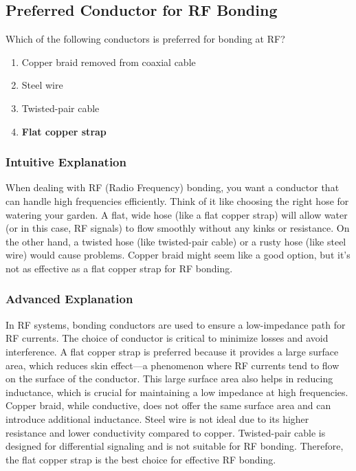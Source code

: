 \subsection{Preferred Conductor for RF Bonding}
\label{T4A08}

\begin{tcolorbox}[colback=gray!10!white,colframe=black!75!black,title=T4A08]
Which of the following conductors is preferred for bonding at RF?
\begin{enumerate}[noitemsep]
    \item Copper braid removed from coaxial cable
    \item Steel wire
    \item Twisted-pair cable
    \item \textbf{Flat copper strap}
\end{enumerate}
\end{tcolorbox}

\subsubsection*{Intuitive Explanation}
When dealing with RF (Radio Frequency) bonding, you want a conductor that can handle high frequencies efficiently. Think of it like choosing the right hose for watering your garden. A flat, wide hose (like a flat copper strap) will allow water (or in this case, RF signals) to flow smoothly without any kinks or resistance. On the other hand, a twisted hose (like twisted-pair cable) or a rusty hose (like steel wire) would cause problems. Copper braid might seem like a good option, but it’s not as effective as a flat copper strap for RF bonding.

\subsubsection*{Advanced Explanation}
In RF systems, bonding conductors are used to ensure a low-impedance path for RF currents. The choice of conductor is critical to minimize losses and avoid interference. A flat copper strap is preferred because it provides a large surface area, which reduces skin effect—a phenomenon where RF currents tend to flow on the surface of the conductor. This large surface area also helps in reducing inductance, which is crucial for maintaining a low impedance at high frequencies. Copper braid, while conductive, does not offer the same surface area and can introduce additional inductance. Steel wire is not ideal due to its higher resistance and lower conductivity compared to copper. Twisted-pair cable is designed for differential signaling and is not suitable for RF bonding. Therefore, the flat copper strap is the best choice for effective RF bonding.